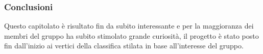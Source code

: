     \subsubsection{Conclusioni}
    Questo capitolato è risultato fin da subito interessante e per la maggioranza dei membri del gruppo ha subito stimolato grande curiosità, il progetto è stato posto fin dall'inizio ai vertici della classifica stilata in base all'interesse del gruppo.
